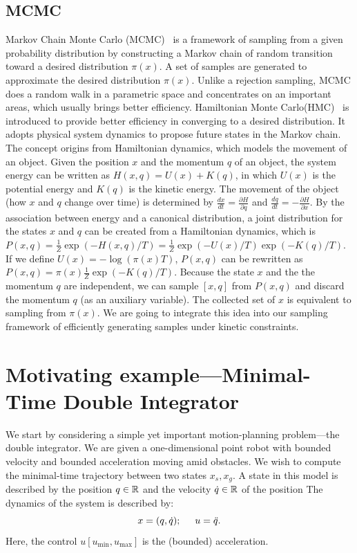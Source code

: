\documentclass[letterpaper, 10 pt, conference]{ieeeconf}  %
\begin{document}
\subsection{MCMC}
\label{subsec:mcmc}
Markov Chain Monte Carlo (MCMC)~\cite{ADDJ03} is a framework of sampling from a given probability distribution by constructing a Markov chain of random transition toward a desired distribution $ \pi (x) $.
A set of samples are generated to approximate the desired distribution $ \pi (x) $.
Unlike a rejection sampling, MCMC does a random walk in a parametric space and concentrates on an important areas, which usually brings better efficiency.
Hamiltonian Monte Carlo(HMC)~\cite{N11} is introduced to provide better efficiency in converging to a desired distribution.
It adopts physical system dynamics to propose future states in the Markov chain.
The concept origins from Hamiltonian dynamics, which models the movement of an object.
Given the position $ x $ and the momentum $ q $ of an object, the system energy can be written as $ H(x,q) = U(x) + K(q) $, in which $ U(x) $ is the potential energy and $ K(q) $ is the kinetic energy.
The movement of the object (how $ x $ and $ q $ change over time) is determined by
$ \frac{dx}{dt} = \frac{\partial H}{\partial q} $ and $ \frac{dq}{dt} = - \frac{\partial H}{\partial x} $.
By the association between energy and a canonical distribution, a joint distribution for the states $ x $ and $ q $ can be created from a Hamiltonian dynamics, which is 
$ P(x, q) = \frac{1}{Z} \exp ( -H(x,q) / T ) = \frac{1}{Z} \exp ( -U(x) / T) \exp (-K(q) / T) $.
If we define $ U(x) = - \log ( \pi(x) T ) $, $ P(x, q) $ can be rewritten as $ P(x, q) = \pi (x) \frac{1}{Z} \exp (-K(q) / T) $.
Because the state $ x $ and the the momentum  $ q $ are independent, we can sample $ [ x ,q ] $ from $ P(x, q) $ and discard the momentum $ q $ (as an auxiliary variable).
The collected set of $ x $ is equivalent to sampling from $ \pi(x) $.
We are going to integrate this idea into our sampling framework of efficiently generating samples under kinetic constraints. 

\section{Motivating example---Minimal-Time Double Integrator}
We start by considering a simple yet important motion-planning problem---the double integrator.
We are given a one-dimensional point robot  with bounded velocity and bounded acceleration moving amid obstacles. We wish to compute the minimal-time trajectory between two states $x_s, x_g$.
A state in this model is described by 
the position $q \in \mathbb{R}$
and
the velocity $\dot{q}\in \mathbb{R}$ of the position
The dynamics of the system is described by:
$$
x = (q, \dot{q}); 
\hspace{5mm}
u = \ddot{q}.
$$
Here, the control $u [u_{\text{min}}, u_{\text{max}}]$ is the (bounded) acceleration. 
\end{document}
